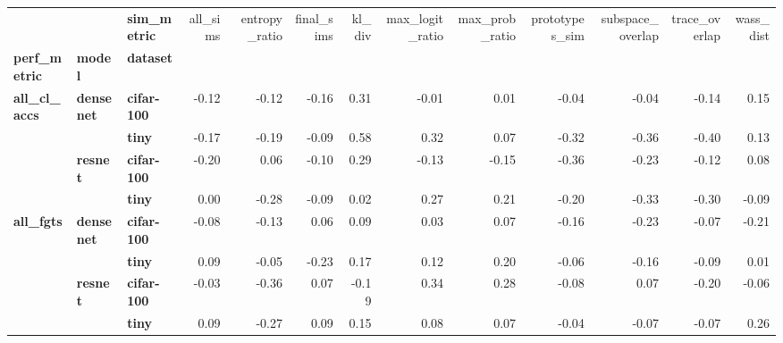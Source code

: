 \begin{tabular}{lllrrrrrrrrrr}
\toprule
         &        & \textbf{sim\_metric} &  all\_sims &  entropy\_ratio &  final\_sims &  kl\_div &  max\_logit\_ratio &  max\_prob\_ratio &  prototypes\_sim &  subspace\_overlap &  trace\_overlap &  wass\_dist \\
\textbf{perf\_metric} & \textbf{model} & \textbf{dataset} &           &                &             &         &                  &                 &                 &                   &                &            \\
\midrule
\multirow{4}{*}{\textbf{all\_cl\_accs}} & \multirow{2}{*}{\textbf{densenet}} & \textbf{cifar-100} &     -0.12 &          -0.12 &       -0.16 &    0.31 &            -0.01 &            0.01 &           -0.04 &             -0.04 &          -0.14 &       0.15 \\
         &        & \textbf{tiny} &     -0.17 &          -0.19 &       -0.09 &    0.58 &             0.32 &            0.07 &           -0.32 &             -0.36 &          -0.40 &       0.13 \\
\cline{2-13}
         & \multirow{2}{*}{\textbf{resnet}} & \textbf{cifar-100} &     -0.20 &           0.06 &       -0.10 &    0.29 &            -0.13 &           -0.15 &           -0.36 &             -0.23 &          -0.12 &       0.08 \\
         &        & \textbf{tiny} &      0.00 &          -0.28 &       -0.09 &    0.02 &             0.27 &            0.21 &           -0.20 &             -0.33 &          -0.30 &      -0.09 \\
\cline{1-13}
\cline{2-13}
\multirow{4}{*}{\textbf{all\_fgts}} & \multirow{2}{*}{\textbf{densenet}} & \textbf{cifar-100} &     -0.08 &          -0.13 &        0.06 &    0.09 &             0.03 &            0.07 &           -0.16 &             -0.23 &          -0.07 &      -0.21 \\
         &        & \textbf{tiny} &      0.09 &          -0.05 &       -0.23 &    0.17 &             0.12 &            0.20 &           -0.06 &             -0.16 &          -0.09 &       0.01 \\
\cline{2-13}
         & \multirow{2}{*}{\textbf{resnet}} & \textbf{cifar-100} &     -0.03 &          -0.36 &        0.07 &   -0.19 &             0.34 &            0.28 &           -0.08 &              0.07 &          -0.20 &      -0.06 \\
         &        & \textbf{tiny} &      0.09 &          -0.27 &        0.09 &    0.15 &             0.08 &            0.07 &           -0.04 &             -0.07 &          -0.07 &       0.26 \\
\bottomrule
\end{tabular}
